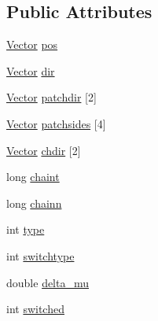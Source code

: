 \subsection*{Public Attributes}
\begin{DoxyCompactItemize}
\item 
\hyperlink{class_vector}{Vector} \hyperlink{struct_particles_a9766a2b5f21ece955b68fc2e7fe00574}{pos}
\item 
\hyperlink{class_vector}{Vector} \hyperlink{struct_particles_aafb56cf5a4a6e8c15540e691d8c384ec}{dir}
\item 
\hyperlink{class_vector}{Vector} \hyperlink{struct_particles_a0905249fbc7f242cc1efdcaa6a8a2937}{patchdir} \mbox{[}2\mbox{]}
\item 
\hyperlink{class_vector}{Vector} \hyperlink{struct_particles_a4ecd830800713531cca99b03e24bc502}{patchsides} \mbox{[}4\mbox{]}
\item 
\hyperlink{class_vector}{Vector} \hyperlink{struct_particles_a7662f9971f75e50391e3034bc122d1f9}{chdir} \mbox{[}2\mbox{]}
\item 
long \hyperlink{struct_particles_ada5f514a676d6204d53ea0f376eddbf8}{chaint}
\item 
long \hyperlink{struct_particles_a04953d98e6e851d694ec2d8c4b083f36}{chainn}
\item 
int \hyperlink{struct_particles_ac148492e8e5c31f3ebb5afb1133292fc}{type}
\item 
int \hyperlink{struct_particles_a5465ea20678db4bf11787294f9a82059}{switchtype}
\item 
double \hyperlink{struct_particles_a1dfd65b0f05feba78b5d983f08c2c277}{delta\+\_\+mu}
\item 
int \hyperlink{struct_particles_a1cdb653ca0fa7ac2e6887a1a0ddb613a}{switched}
\end{DoxyCompactItemize}


